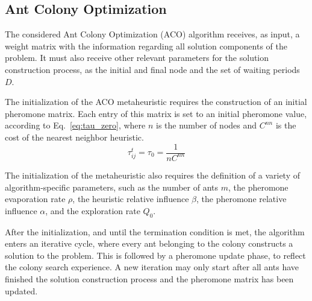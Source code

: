 \subsection{Ant Colony Optimization}
\label{sec:aco}

The considered Ant Colony Optimization (ACO) algorithm receives, as input, a weight matrix with the information regarding all solution components of the problem. It must also receive other relevant parameters for the solution construction process, as the initial and final node and the set of waiting periods $D$. 

The initialization of the ACO metaheuristic requires the construction of an initial pheromone matrix. Each entry of this matrix is set to an initial pheromone value, according to Eq.~\ref{eq:tau_zero}, where $n$ is the number of nodes and $C^{nn}$ is the cost of the nearest neighbor heuristic. 
\begin{equation}
\label{eq:tau_zero}
  \tau_{ij}^{t} = \tau_{0} = \frac{1}{nC^{nn}}
\end{equation}

The initialization of the metaheuristic also requires the definition of a variety of algorithm-specific parameters, such as the number of ants $m$, the pheromone evaporation rate $\rho$, the heuristic relative influence $\beta$, the pheromone relative influence $\alpha$, and the exploration rate $Q_0$. 

After the initialization, and until the termination condition is met, the algorithm enters an iterative cycle, where every ant belonging to the colony constructs a solution to the problem. This is followed by a pheromone update phase, to reflect the colony search experience. A new iteration may only start after all ants have finished the solution construction process and the pheromone matrix has been updated.


